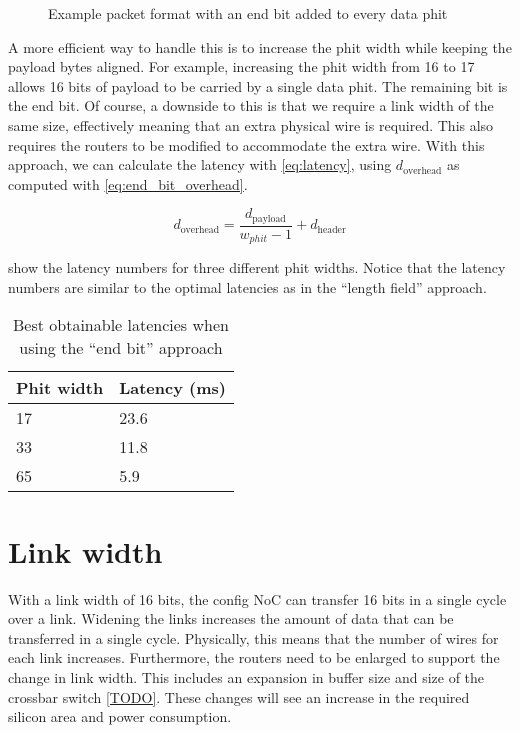 \hspace*{0.5em}
\begin{figure}[hbtp]
    \centering
    \begin{adjustbox}{width=0.8\linewidth}
        
    \end{adjustbox}
    \caption{Example packet format with an end bit added to every data phit}
    \label{fig:example_packet_format_end_bit}
\end{figure}

A more efficient way to handle this is to increase the phit width while keeping the payload bytes aligned.
For example, increasing the phit width from 16 to 17 allows 16 bits of payload to be carried by a single data phit.
The remaining bit is the end bit.
Of course, a downside to this is that we require a link width of the same size, effectively meaning that an extra physical wire is required.
This also requires the routers to be modified to accommodate the extra wire.
With this approach, we can calculate the latency with \cref{eq:latency}, using $d_{\text{overhead}}$ as computed with \cref{eq:end_bit_overhead}. 

\begin{equation}
    d_{\text{overhead}} = \frac{d_{\text{payload}}}{w_{phit} - 1} + d_{\text{header}}
\label{eq:end_bit_overhead}
\end{equation}

 show the latency numbers for three different phit widths.
Notice that the latency numbers are similar to the optimal latencies as in the ``length field'' approach. 

\begin{table}[hbtp]
\centering
\begin{tabular}{@{}ll@{}}
\toprule
\textbf{Phit width} & \textbf{Latency (ms)} \\ \midrule
17        & 23.6                  \\
33        & 11.8                  \\
65        & 5.9                   \\ \bottomrule
\end{tabular}
\caption{Best obtainable latencies when using the ``end bit'' approach}
\label{tab:end_bit_latency}
\end{table}

\section{Link width}
With a link width of 16 bits, the config NoC can transfer 16 bits in a single cycle over a link.
Widening the links increases the amount of data that can be transferred in a single cycle.
Physically, this means that the number of wires for each link increases.
Furthermore, the routers need to be enlarged to support the change in link width.
This includes an expansion in buffer size and size of the crossbar switch \cref{TODO}.
These changes will see an increase in the required silicon area and power consumption.

